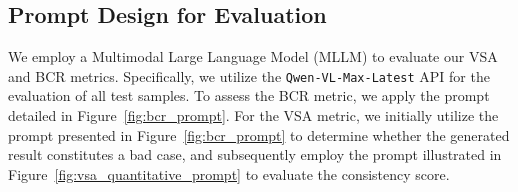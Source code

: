 \documentclass{llmxive}
\begin{document}
\subsection{Prompt Design for Evaluation}

We employ a Multimodal Large Language Model (MLLM) to evaluate our VSA and BCR metrics. Specifically, we utilize the \texttt{Qwen-VL-Max-Latest} API for the evaluation of all test samples. To assess the BCR metric, we apply the prompt detailed in Figure~\ref{fig:bcr_prompt}. For the VSA metric, we initially utilize the prompt presented in Figure~\ref{fig:bcr_prompt} to determine whether the generated result constitutes a bad case, and subsequently employ the prompt illustrated in Figure~\ref{fig:vsa_quantitative_prompt} to evaluate the consistency score.
\end{document}
